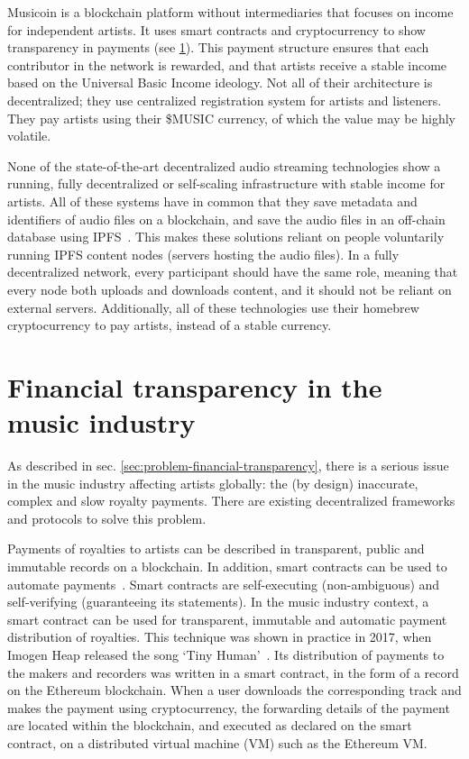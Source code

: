 Musicoin is a blockchain platform without intermediaries that focuses on income for independent artists. It uses smart contracts and cryptocurrency to show transparency in payments (see \ref{sec:smart-contracts}). This payment structure ensures that each contributor in the network is rewarded, and that artists receive a stable income based on the Universal Basic Income ideology. Not all of their architecture is decentralized; they use centralized registration system for artists and listeners. They pay artists using their \$MUSIC currency, of which the value may be highly volatile.

None of the state-of-the-art decentralized audio streaming technologies show a running, fully decentralized or self-scaling infrastructure with stable income for artists. All of these systems have in common that they save metadata and identifiers of audio files on a blockchain, and save the audio files in an off-chain database using IPFS~\citep{benet2014ipfs}. This makes these solutions reliant on people voluntarily running IPFS content nodes (servers hosting the audio files). In a fully decentralized network, every participant should have the same role, meaning that every node both uploads and downloads content, and it should not be reliant on external servers. Additionally, all of these technologies use their homebrew cryptocurrency to pay artists, instead of a stable currency.

\section{Financial transparency in the music industry}
\label{sec:smart-contracts}
As described in sec. \ref{sec:problem-financial-transparency}, there is a serious issue in the music industry affecting artists globally: the (by design) inaccurate, complex and slow royalty payments. There are existing decentralized frameworks and protocols to solve this problem.

Payments of royalties to artists can be described in transparent, public and immutable records on a blockchain. In addition, smart contracts can be used to automate payments~\citep{buterin2014next}. Smart contracts are self-executing (non-ambiguous) and self-verifying (guaranteeing its statements). In the music industry context, a smart contract can be used for transparent, immutable and automatic payment distribution of royalties. This technique was shown in practice in 2017, when Imogen Heap released the song `Tiny Human'~\citep{heap2017blockchain}. Its distribution of payments to the makers and recorders was written in a smart contract, in the form of a record on the Ethereum blockchain. When a user downloads the corresponding track and makes the payment using cryptocurrency, the forwarding details of the payment are located within the blockchain, and executed as declared on the smart contract, on a distributed virtual machine (VM) such as the Ethereum VM.

